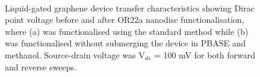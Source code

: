 \documentclass[
  a4paper,
]{scrbook}
\begin{document}
\begin{figure}
\begin{minipage}[t]{0.45\linewidth}
{{}

}

\end{minipage}%
%
\begin{minipage}[t]{0.01\linewidth}

{\centering 

~

}

\end{minipage}%

\caption[Liquid-gated graphene device transfer characteristics showing
Dirac point voltage before and after OR22a nanodisc functionalisation
with or without the use of PBASE and
methanol.]{\label{fig-graphene-sensing-TX}Liquid-gated graphene device
transfer characteristics showing Dirac point voltage before and after
OR22a nanodisc functionalisation, where (a) was functionalised using the
standard method while (b) was functionalised without submerging the
device in PBASE and methanol. Source-drain voltage was V\(_{ds}\) = 100
mV for both forward and reverse sweeps.}

\end{figure}
\end{document}

